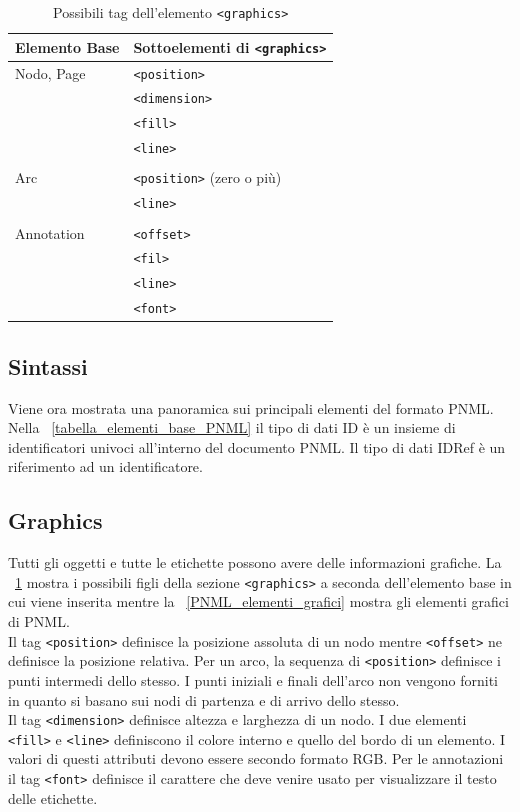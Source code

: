 \documentclass[italian,12pt]{book}
\begin{document}
\begin{table}
  \begin{tabular}{|l|l|}
    \hline
    Elemento Base         & Sottoelementi di {\tt<graphics>} \\
    \hline
    Nodo, Page            & {\tt<position>} \\
    & {\tt<dimension>} \\
    & {\tt<fill>} \\
    & {\tt<line>} \\
    & \\
    Arc                   & {\tt<position>} (zero o più) \\
    & {\tt<line>} \\
    & \\
    Annotation            & {\tt<offset>} \\
    & {\tt<fil>} \\
    & {\tt<line>} \\
    & {\tt<font>} \\
    \hline
  \end{tabular}
  \caption{Possibili tag dell'elemento {\tt<graphics>}\label{tabella_graphics}}
\end{table}

\subsection{Sintassi}
Viene ora mostrata una panoramica sui principali elementi del formato PNML.
Nella \tablename~\ref{tabella_elementi_base_PNML} il tipo di dati ID è un insieme
di identificatori univoci all'interno del documento PNML. Il tipo di dati IDRef
è un riferimento ad un identificatore.

\subsection{Graphics}
Tutti gli oggetti e tutte le etichette possono avere delle informazioni grafiche.
La \tablename~\ref{tabella_graphics} mostra i possibili figli della
sezione  {\tt<graphics>} a seconda dell'elemento base in cui viene inserita mentre la \tablename~\ref{PNML_elementi_grafici} mostra gli elementi grafici di PNML.\\
Il tag {\tt<position>}  definisce la posizione assoluta di un nodo mentre {\tt<offset>} 
ne definisce la posizione relativa. Per un arco, la sequenza di {\tt<position>} 
definisce i punti intermedi dello stesso. I punti iniziali e finali dell'arco non vengono forniti
in quanto si basano sui nodi di partenza e di arrivo dello stesso.\\
Il tag {\tt<dimension>}  definisce altezza e larghezza di un nodo. I due elementi 
{\tt<fill>}  e {\tt<line>}  definiscono il colore interno e quello del bordo 
di un elemento. I valori di questi attributi devono essere secondo formato RGB.
Per le annotazioni il tag {\tt<font>} definisce il carattere 
che deve venire usato per visualizzare il testo delle etichette.
\end{document}
